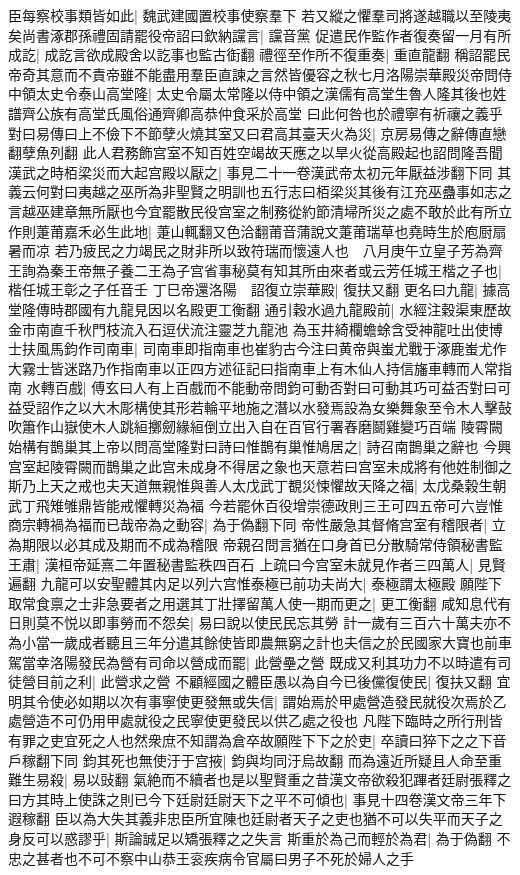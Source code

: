 臣每察校事類皆如此|{
	魏武建國置校事使察羣下}
若又縱之懼羣司將遂越職以至陵夷矣尚書涿郡孫禮固請罷役帝詔曰欽納讜言|{
	讜音黨}
促遣民作監作者復奏留一月有所成訖|{
	成訖言欲成殿舍以訖事也監古衘翻}
禮徑至作所不復重奏|{
	重直龍翻}
稱詔罷民帝奇其意而不責帝雖不能盡用羣臣直諫之言然皆優容之秋七月洛陽崇華殿災帝問侍中領太史令泰山高堂隆|{
	太史令屬太常隆以侍中領之漢儒有高堂生魯人隆其後也姓譜齊公族有高堂氏風俗通齊卿高恭仲食采於高堂}
曰此何咎也於禮寧有祈禳之義乎對曰易傳曰上不儉下不節孽火燒其室又曰君高其臺天火為災|{
	京房易傳之辭傳直戀翻孽魚列翻}
此人君務飾宫室不知百姓空竭故天應之以旱火從高殿起也詔問隆吾聞漢武之時栢梁災而大起宫殿以厭之|{
	事見二十一卷漢武帝太初元年厭益涉翻下同}
其義云何對曰夷越之巫所為非聖賢之明訓也五行志曰栢梁災其後有江充巫蠱事如志之言越巫建章無所厭也今宜罷散民役宫室之制務從約節清埽所災之處不敢於此有所立作則萐莆嘉禾必生此地|{
	萐山輒翻又色洽翻莆音蒲說文萐莆瑞草也堯時生於庖厨扇暑而凉}
若乃疲民之力竭民之財非所以致符瑞而懷遠人也　八月庚午立皇子芳為齊王詢為秦王帝無子養二王為子宫省事秘莫有知其所由來者或云芳任城王楷之子也|{
	楷任城王彰之子任音壬}
丁巳帝還洛陽　詔復立崇華殿|{
	復扶又翻}
更名曰九龍|{
	據高堂隆傳時郡國有九龍見因以名殿更工衡翻}
通引穀水過九龍殿前|{
	水經注穀渠東歷故金市南直千秋門枝流入石逗伏流注靈芝九龍池}
為玉井綺欄蟾蜍含受神龍吐出使博士扶風馬鈞作司南車|{
	司南車即指南車也崔豹古今注曰黄帝與蚩尤戰于涿鹿蚩尤作大霧士皆迷路乃作指南車以正四方述征記曰指南車上有木仙人持信旛車轉而人常指南}
水轉百戲|{
	傅玄曰人有上百戲而不能動帝問鈞可動否對曰可動其巧可益否對曰可益受詔作之以大木彫構使其形若輪平地施之潛以水發焉設為女樂舞象至令木人擊鼔吹簫作山嶽使木人跳絙擲劒緣絙倒立出入自在百官行署舂磨鬬雞變巧百端}
陵霄闕始構有鵲巢其上帝以問高堂隆對曰詩曰惟鵲有巢惟鳩居之|{
	詩召南鵲巢之辭也}
今興宫室起陵霄闕而鵲巢之此宫未成身不得居之象也天意若曰宫室未成將有他姓制御之斯乃上天之戒也夫天道無親惟與善人太戊武丁覩災悚懼故天降之福|{
	太戊桑榖生朝武丁飛雉雊鼎皆能戒懼轉災為福}
今若罷休百役增崇德政則三王可四五帝可六豈惟商宗轉禍為福而已哉帝為之動容|{
	為于偽翻下同}
帝性嚴急其督脩宫室有稽限者|{
	立為期限以必其成及期而不成為稽限}
帝親召問言猶在口身首已分散騎常侍領秘書監王肅|{
	漢桓帝延熹二年置秘書監秩四百石}
上疏曰今宫室未就見作者三四萬人|{
	見賢遍翻}
九龍可以安聖體其内足以列六宫惟泰極已前功夫尚大|{
	泰極謂太極殿}
願陛下取常食禀之士非急要者之用選其丁壯擇留萬人使一期而更之|{
	更工衡翻}
咸知息代有日則莫不悦以即事勞而不怨矣|{
	易曰說以使民民忘其勞}
計一歲有三百六十萬夫亦不為小當一歲成者聽且三年分遣其餘使皆即農無窮之計也夫信之於民國家大寶也前車駕當幸洛陽發民為營有司命以營成而罷|{
	此營壘之營}
既成又利其功力不以時遣有司徒營目前之利|{
	此營求之營}
不顧經國之體臣愚以為自今已後儻復使民|{
	復扶又翻}
宜明其令使必如期以次有事寧使更發無或失信|{
	謂始焉於甲處營造發民就役次焉於乙處營造不可仍用甲處就役之民寧使更發民以供乙處之役也}
凡陛下臨時之所行刑皆有罪之吏宜死之人也然衆庶不知謂為倉卒故願陛下下之於吏|{
	卒讀曰猝下之之下音戶稼翻下同}
鈞其死也無使汙于宫掖|{
	鈞與均同汙烏故翻}
而為遠近所疑且人命至重難生易殺|{
	易以䜴翻}
氣絶而不續者也是以聖賢重之昔漢文帝欲殺犯蹕者廷尉張釋之曰方其時上使誅之則已今下廷尉廷尉天下之平不可傾也|{
	事見十四卷漢文帝三年下遐稼翻}
臣以為大失其義非忠臣所宜陳也廷尉者天子之吏也猶不可以失平而天子之身反可以惑謬乎|{
	斯論誠足以矯張釋之之失言}
斯重於為己而輕於為君|{
	為于偽翻}
不忠之甚者也不可不察中山恭王衮疾病令官屬曰男子不死於婦人之手

